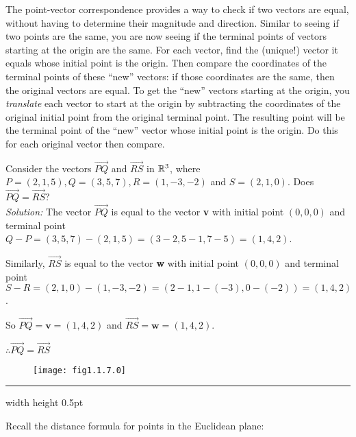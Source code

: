 The point-vector correspondence provides a way to check if two vectors are equal, without having to determine their magnitude and direction.  
Similar to seeing if two points are the same, you are now seeing if the terminal points of vectors starting at the origin are the same.  
For each vector, find the (unique!) vector it equals whose initial point is the origin.  
Then compare the coordinates of the terminal points of these ``new'' vectors: 
if those coordinates are the same, then the original vectors are equal.  
To get the ``new'' vectors starting at the origin, you \emph{translate}
each vector to start at the origin by subtracting the coordinates of the original
initial point from the original terminal point.  The resulting point will be the terminal point of
the ``new'' vector whose initial point is the origin.  Do this for each original vector then compare.

\begin{exmp}
 Consider the vectors $\overrightarrow{PQ}$ and $\overrightarrow{RS}$ in $\mathbb{R}^{3}$, where $P = (2,1,5),
 Q = (3,5,7), R = (1,-3,-2)$ and $S = (2,1,0)$.  Does $\overrightarrow{PQ} =
 \overrightarrow{RS}$?\\\emph{Solution:}
 The vector $\overrightarrow{PQ}$ is equal to the vector \textbf{v} with
 initial point $(0,0,0)$ and terminal point $Q - P = (3,5,7) - (2,1,5) = (3 - 2,5 - 1,7 - 5) = (1,4,2)$.
 \par\noindent
 Similarly, $\overrightarrow{RS}$ is equal to the vector \textbf{w} with
 initial point $(0,0,0)$ and terminal point $S - R = (2,1,0) - (1,-3,-2) = (2 - 1, 1 - (-3),0 - (-2)) = (1,4,2)$.
 \par\noindent
 So $\overrightarrow{PQ} = \textbf{v} = (1,4,2)$ and $\overrightarrow{RS} = \textbf{w} = (1,4,2)$.
 \par\noindent
 $\therefore \overrightarrow{PQ} = \overrightarrow{RS}$
\end{exmp}
\begin{figure}[h]
 \begin{center}
  \texttt{[image: fig1.1.7.0]}
 \end{center}
 \caption[]{}
 \label{fig:ex1.2}
\end{figure}
\hrule width \textwidth height 0.5pt
\medskip

Recall the distance formula for points in the Euclidean plane:

\medskip
{}
\medskip

